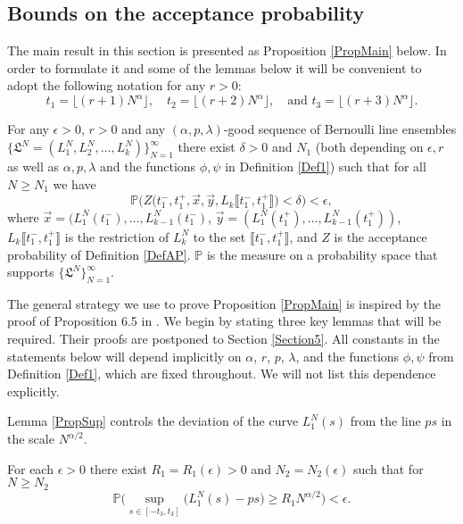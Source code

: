 \subsection{Bounds on the acceptance probability}\label{Section4.1}
 The main result in this section is presented as Proposition \ref{PropMain} below. In order to formulate it and some of the lemmas below it will be convenient to adopt the following notation for any $r > 0$:
\begin{equation}\label{eqsts}
t_1 =\lfloor (r+1) N^{\alpha} \rfloor,\quad t_2 = \lfloor (r+2)N^{\alpha} \rfloor,\quad \textrm{and } t_3 = \lfloor (r+3)N^{\alpha} \rfloor.
\end{equation}
\begin{proposition}\label{PropMain} For any $\epsilon > 0$, $r > 0$ and any $(\alpha,p,\lambda)$-good sequence of Bernoulli line ensembles $\big\{ \mathfrak{L}^N  = (L^N_1,L^N_2, \dots, L^N_k)\big\}_{N=1}^{\infty}$
there exist $\delta > 0$ and $N_1$ (both depending on $\epsilon, r$ as well as $ \alpha, p, \lambda$ and the functions $\phi, \psi$ in Definition \ref{Def1}) such that for all $N \geq N_1$
we have 
$$\mathbb{P}\Big(Z\big( t_1^-,t_1^+, \vec{x}, \vec{y} , L_{k}\llbracket t_1^-, t_1^+\rrbracket\big) < \delta\Big) < \epsilon,$$
where $\vec{x} = (L_1^N(t_1^-), \dots, L_{k-1}^N(t_1^-)$, $\vec{y} = (L_1^N(t_1^+), \dots, L^N_{k-1}(t_1^+))$,  $ L_{k}\llbracket t_1^-, t_1^+\rrbracket$ is the restriction of $L^N_k$ to the set $\llbracket t_1^-, t_1^+\rrbracket$, and $Z$ is the acceptance probability of Definition \ref{DefAP}. $\mathbb{P}$ is the measure on a probability space that supports $\big\{ \mathfrak{L}^N \big\}_{N = 1}^\infty$.
\end{proposition}

The general strategy we use to prove Proposition \ref{PropMain} is inspired by the proof of Proposition 6.5 in \cite{CorHamK}. We begin by stating three key lemmas that will be required. Their proofs are postponed to Section \ref{Section5}. All constants in the statements below will depend implicitly on $\alpha$, $r$, $p$, $\lambda$, and the functions $\phi, \psi$ from Definition \ref{Def1}, which are fixed throughout. We will not list this dependence explicitly.

Lemma \ref{PropSup} controls the deviation of the curve $L^N_1(s)$ from the line $ps$ in the scale $N^{\alpha/2}$.
\begin{lemma}\label{PropSup} For each $\epsilon > 0$ there exist $R_1=R_1(\epsilon) > 0$ and $N_2= N_2(\epsilon)$ such that for $N \geq N_2$ 
$$\mathbb{P}\Big( \sup_{s \in [ -t_3, t_3] }\big( L^N_1(s) - p s \big) \geq  R_1N^{\alpha/2} \Big) < \epsilon.$$
\end{lemma}


